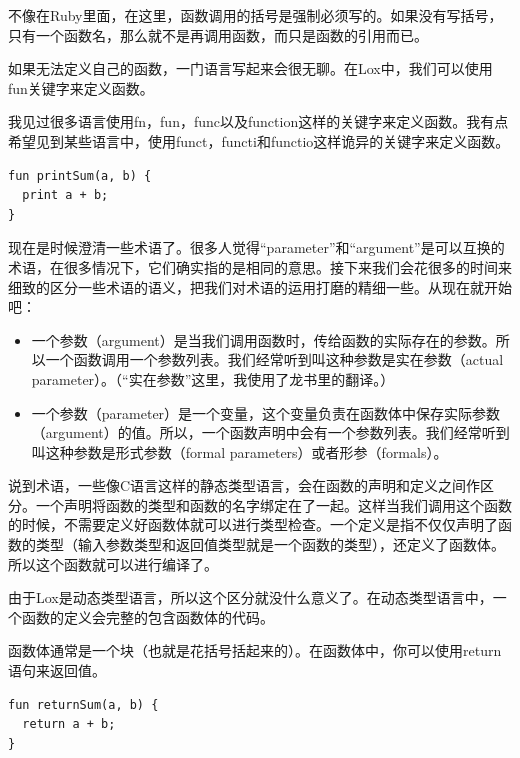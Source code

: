 \documentclass[cn,10pt,math=newtx,citestyle=gb7714-2015,bibstyle=gb7714-2015]{elegantbook}
\begin{document}
不像在Ruby里面，在这里，函数调用的括号是强制必须写的。如果没有写括号，只有一个函数名，那么就不是再调用函数，而只是函数的引用而已。

如果无法定义自己的函数，一门语言写起来会很无聊。在Lox中，我们可以使用fun关键字来定义函数。

\begin{tcolorbox}
我见过很多语言使用fn，fun，func以及function这样的关键字来定义函数。我有点希望见到某些语言中，使用funct，functi和functio这样诡异的关键字来定义函数。
\end{tcolorbox}

\begin{verbatim}
fun printSum(a, b) {
  print a + b;
}
\end{verbatim}

现在是时候澄清一些术语了。很多人觉得“parameter”和“argument”是可以互换的术语，在很多情况下，它们确实指的是相同的意思。接下来我们会花很多的时间来细致的区分一些术语的语义，把我们对术语的运用打磨的精细一些。从现在就开始吧：

\begin{itemize}
\item 一个参数（argument）是当我们调用函数时，传给函数的实际存在的参数。所以一个函数调用一个参数列表。我们经常听到叫这种参数是实在参数（actual parameter）。（“实在参数”这里，我使用了龙书里的翻译。）
\item 一个参数（parameter）是一个变量，这个变量负责在函数体中保存实际参数（argument）的值。所以，一个函数声明中会有一个参数列表。我们经常听到叫这种参数是形式参数（formal parameters）或者形参（formals）。
\end{itemize}

\begin{tcolorbox}
说到术语，一些像C语言这样的静态类型语言，会在函数的声明和定义之间作区分。一个声明将函数的类型和函数的名字绑定在了一起。这样当我们调用这个函数的时候，不需要定义好函数体就可以进行类型检查。一个定义是指不仅仅声明了函数的类型（输入参数类型和返回值类型就是一个函数的类型），还定义了函数体。所以这个函数就可以进行编译了。

由于Lox是动态类型语言，所以这个区分就没什么意义了。在动态类型语言中，一个函数的定义会完整的包含函数体的代码。
\end{tcolorbox}

函数体通常是一个块（也就是花括号括起来的）。在函数体中，你可以使用return语句来返回值。

\begin{verbatim}
fun returnSum(a, b) {
  return a + b;
}
\end{verbatim}
\end{document}
